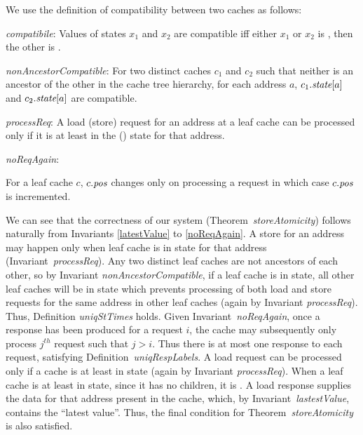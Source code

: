 We use the definition of compatibility between two caches as follows:
\begin{defn}
\textit{compatibile}: Values of states $x_1$ and $x_2$ are compatible iff
either $x_1$ or $x_2$ is \Mo{}, then the other is \In.
\label{compatible}
\end{defn}

\begin{inv}
\textit{nonAncestorCompatible}: For two distinct caches $c_1$ and $c_2$ such
that neither is an ancestor of the other in the cache tree hierarchy, for each
address $a$, $c_1.\textit{state}[a]$ and $c_2.\textit{state}[a]$ are compatible.
\label{nonAncestorCompatible}
\end{inv}

\begin{inv}
\textit{processReq}: A load (store) request for an address at a leaf cache can
be processed only if it is at least in the \Sh{} (\Mo) state for that address.
\label{processReq}
\end{inv}

\begin{inv}
\textit{noReqAgain}:
\item For a leaf cache $c$, $c.\textit{pos}$ changes only on processing a request in
which case $c.\textit{pos}$ is incremented.
\label{noReqAgain}
\end{inv}

We can see that the correctness of our system (Theorem~\textit{storeAtomicity})
follows naturally from Invariants \ref{latestValue} to \ref{noReqAgain}.  A
store for an address may happen only when leaf cache is in \Mo{} state for that
address (Invariant~\textit{processReq}). Any two distinct leaf caches are not
ancestors of each other, so by Invariant \textit{nonAncestorCompatible}, if a
leaf cache is in \Mo{} state, all other leaf caches will be in \In{} state
which prevents processing of both load and store requests for the same address
in other leaf caches (again by Invariant \textit{processReq}). Thus, Definition
\textit{uniqStTimes} holds.  Given Invariant~\textit{noReqAgain}, once a
response has been produced for a request $i$, the cache may subsequently only
process $j^{th}$ request such that $j > i$. Thus there is at most one response
to each request, satisfying Definition~\textit{uniqRespLabels}. A load request
can be processed only if a cache is at least in \Sh{} state (again by Invariant
\textit{processReq}). When a leaf cache is at least in \Sh{} state, since it
has no children, it is \clean. A load response supplies the data for that
address present in the cache, which, by Invariant~\textit{lastestValue},
contains the ``latest value''. Thus, the final condition for
Theorem~\textit{storeAtomicity} is also satisfied.

